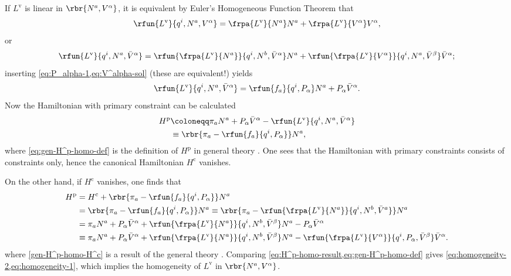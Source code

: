 If $L^\text{v}$ is linear in $\rbr{N^a, V^\alpha}$, it is equivalent by Euler's 
Homogeneous Function Theorem \cite{Border_2000} that
\begin{equation}
\rfun{L^\text{v}}{q^i, N^a, V^\alpha} = \frpa{L^\text{v}}{N^a}N^a + 
\frpa{L^\text{v}}{V^\alpha}V^\alpha,
\label{eq:homogeneity-1}
\end{equation}
or
\begin{equation}
\rfun{L^\text{v}}{q^i, N^a, \bar V^\alpha} =
\rfun{\frpa{L^\text{v}}{N^a}}{q^i, N^b, \bar V^\alpha} N^a + 
\rfun{\frpa{L^\text{v}}{V^\alpha}}{q^i, N^a, \bar V^\beta} \bar V^\alpha;
\label{eq:homogeneity-2}
\end{equation}
inserting \cref{eq:P_alpha-1,eq:V^alpha-sol} (these are equivalent!) yields
\begin{equation}
\rfun{L^\text{v}}{q^i, N^a, \bar V^\alpha} = \rfun{f_a}{q^i, P_\alpha} N^a + 
P_\alpha \bar V^\alpha.
\label{eq:L^v-bar-V}
\end{equation}
Now the Hamiltonian with primary constraint can be calculated
\begin{align}
H^\text{p} &\coloneqq \pi_a N^a + P_\alpha \bar V^\alpha - 
\rfun{L^\text{v}}{q^i, N^a, \bar V^\alpha} \label{eq:gen-H^p-homo-def} \\
&\equiv \rbr{\pi_a - \rfun{f_a}{q^i, P_\alpha}}N^a,
\end{align}
where \cref{eq:gen-H^p-homo-def} is the definition of $H^\text{p}$ in general
theory \cite[ch.~2]{Gitman_1990}. One sees that the Hamiltonian with primary 
constraints consists of constraints only, hence the canonical Hamiltonian 
$H^\text{c}$ vanishes.

On the other hand, if $H^\text{c}$ vanishes, one finds that
\begin{align}
H^\text{p} &= H^\text{c} + \rbr{\pi_a - \rfun{f_a}{q^i, P_\alpha}}N^a 
\label{eq:gen-H^p-homo-H^c} \\
&= \rbr{\pi_a - \rfun{f_a}{q^i, P_\alpha}}N^a 
\equiv \rbr{\pi_a - \rfun{\frpa{L^\text{v}}{N^a}}{q^i, N^b, \bar V^a}} N^a
\nonumber \\
&= \pi_a N^a + P_\alpha \bar V^\alpha
+ \rfun{\frpa{L^\text{v}}{N^a}}{q^i, N^b, \bar V^\beta} N^a
- P_\alpha \bar V^\alpha \nonumber \\
&\equiv \pi_a N^a + P_\alpha \bar V^\alpha
+ \rfun{\frpa{L^\text{v}}{N^a}}{q^i, N^b, \bar V^\beta} N^a
- \rfun{\frpa{L^\text{v}}{V^\alpha}}{q^i, P_\alpha, \bar V^\beta}
\bar V^\alpha. \label{eq:H^p-homo-result}
\end{align}
where \cref{gen-H^p-homo-H^c} is a result of the general theory 
\cite[ch.~2]{Gitman_1990}. Comparing 
\cref{eq:H^p-homo-result,eq:gen-H^p-homo-def} gives 
\cref{eq:homogeneity-2,eq:homogeneity-1}, which implies the homogeneity of 
$L^\text{v}$ in $\rbr{N^a, V^\alpha}$.

